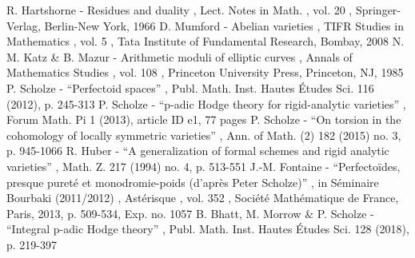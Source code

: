  R. Hartshorne - Residues and duality , Lect. Notes in Math. , vol. 20 , Springer-Verlag, Berlin-New York, 1966
 D. Mumford - Abelian varieties , TIFR Studies in Mathematics , vol. 5 , Tata Institute of Fundamental Research, Bombay, 2008
 N. M. Katz \& B. Mazur - Arithmetic moduli of elliptic curves , Annals of Mathematics Studies , vol. 108 , Princeton University Press, Princeton, NJ, 1985
 P. Scholze - “Perfectoid spaces” , Publ. Math. Inst. Hautes Études Sci. 116 (2012), p. 245-313
 P. Scholze - “p-adic Hodge theory for rigid-analytic varieties” , Forum Math. Pi 1 (2013), article ID e1, 77 pages
 P. Scholze - “On torsion in the cohomology of locally symmetric varieties” , Ann. of Math. (2) 182 (2015) no. 3, p. 945-1066
 R. Huber - “A generalization of formal schemes and rigid analytic varieties” , Math. Z. 217 (1994) no. 4, p. 513-551
 J.-M. Fontaine - “Perfectoïdes, presque pureté et monodromie-poids (d’après Peter Scholze)” , in Séminaire Bourbaki (2011/2012) , Astérisque , vol. 352 , Société Mathématique de France, Paris, 2013, p. 509-534, Exp. no. 1057
 B. Bhatt, M. Morrow \& P. Scholze - “Integral p-adic Hodge theory” , Publ. Math. Inst. Hautes Études Sci. 128 (2018), p. 219-397
